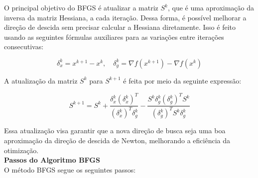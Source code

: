 \documentclass[a4paper, 12pt]{article}
\begin{document}
O principal objetivo do BFGS é atualizar a matriz $S^k$, que é uma aproximação da inversa da matriz Hessiana, a cada iteração. Dessa forma, é possível melhorar a direção de descida sem precisar calcular a Hessiana diretamente. Isso é feito usando as seguintes fórmulas auxiliares para as variações entre iterações consecutivas:

\begin{equation}
\delta_x^k = x^{k+1} - x^k, \quad \delta_g^k = \nabla f(x^{k+1}) - \nabla f(x^k)
\end{equation}

A atualização da matriz $S^k$ para $S^{k+1}$ é feita por meio da seguinte expressão:

\begin{equation}
S^{k+1} = S^k + \frac{\delta_x^k (\delta_x^k)^T}{(\delta_x^k)^T \delta_g^k} - \frac{S^k \delta_g^k (\delta_g^k)^T S^k}{(\delta_g^k)^T S^k \delta_g^k}
\end{equation}

Essa atualização visa garantir que a nova direção de busca seja uma boa aproximação da direção de descida de Newton, melhorando a eficiência da otimização.\\

\textbf{Passos do Algoritmo BFGS}\\

O método BFGS segue os seguintes passos:
\end{document}
